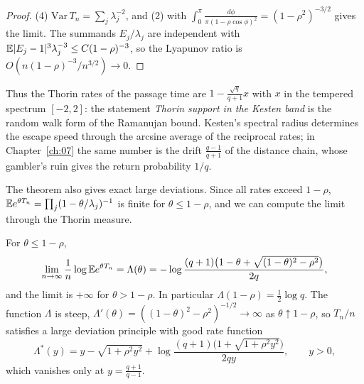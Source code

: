 \begin{proof}
(4) $\mathrm{Var}\,T_n=\sum_j\lambda_j^{-2}$, and (2) with $\int_0^\pi\frac{d\phi}{\pi(1-\rho\cos\phi)^2}=(1-\rho^2)^{-3/2}$ gives the limit. The summands $E_j/\lambda_j$ are independent with $\mathbb{E}|E_j-1|^3\lambda_j^{-3}\le C(1-\rho)^{-3}$, so the Lyapunov ratio is $O(n(1-\rho)^{-3}/n^{3/2})\to0$.
\end{proof}

Thus the Thorin rates of the passage time are $1-\frac{\sqrt q}{q+1}x$ with $x$ in the tempered spectrum $[-2,2]$: the statement \emph{Thorin support in the Kesten band} is the random walk form of the Ramanujan bound. Kesten's spectral radius determines the escape speed through the arcsine average of the reciprocal rates; in Chapter~\ref{ch:07} the same number is the drift $\frac{q-1}{q+1}$ of the distance chain, whose gambler's ruin gives the return probability $1/q$.

The theorem also gives exact large deviations. Since all rates exceed $1-\rho$, $\mathbb{E} e^{\theta T_n}=\prod_j(1-\theta/\lambda_j)^{-1}$ is finite for $\theta\le1-\rho$, and we can compute the limit through the Thorin measure.

\begin{theorem}\label{thm:10cldp}
For $\theta\le1-\rho$,
\[
\lim_{n\to\infty}\frac1n\log\mathbb{E} e^{\theta T_n}=\Lambda(\theta)=-\log\frac{(q+1)\bigl(1-\theta+\sqrt{(1-\theta)^2-\rho^2}\bigr)}{2q},
\]
and the limit is $+\infty$ for $\theta>1-\rho$. In particular $\Lambda(1-\rho)=\frac12\log q$. The function $\Lambda$ is steep, $\Lambda'(\theta)=((1-\theta)^2-\rho^2)^{-1/2}\to\infty$ as $\theta\uparrow1-\rho$, so $T_n/n$ satisfies a large deviation principle with good rate function
\[
\Lambda^*(y)=y-\sqrt{1+\rho^2y^2}+\log\frac{(q+1)\bigl(1+\sqrt{1+\rho^2y^2}\bigr)}{2qy},\qquad y>0,
\]
which vanishes only at $y=\frac{q+1}{q-1}$.
\end{theorem}

